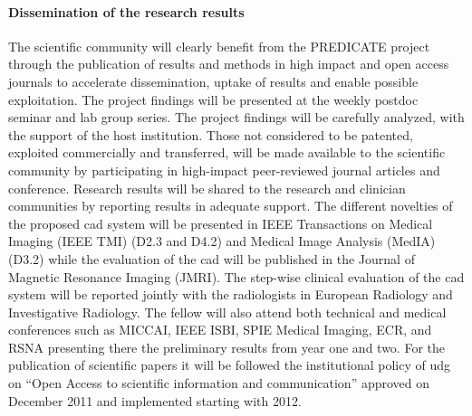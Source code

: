 \paragraph{Dissemination of the research results}
The scientific community will clearly benefit from the PREDICATE project through the publication of results and methods in high impact and open access journals to accelerate dissemination, uptake of results and enable possible exploitation.
The project findings will be presented at the weekly postdoc seminar and lab group series.
The project findings will be carefully analyzed, with the support of the host institution.
Those not considered to be patented, exploited commercially and transferred, will be made available to the scientific community by participating in high-impact peer-reviewed journal articles and conference.
Research results will be shared to the research and clinician communities by reporting results in adequate support.
The different novelties of the proposed \ac{cad} system will be presented in IEEE Transactions on Medical Imaging (IEEE TMI) (D2.3 and D4.2) and Medical Image Analysis (MedIA) (D3.2) while the evaluation of the \ac{cad} will be published in the Journal of Magnetic Resonance Imaging (JMRI).
The step-wise clinical evaluation of the \ac{cad} system will be reported jointly with the radiologists in European Radiology and Investigative Radiology.
The fellow will also attend both technical and medical conferences such as MICCAI, IEEE ISBI, SPIE Medical Imaging, ECR, and RSNA presenting there the preliminary results from year one and two.
For the publication of scientific papers it will be followed the institutional policy of \ac{udg} on ``Open Access to scientific information and communication'' approved on December 2011 and implemented starting with 2012.
